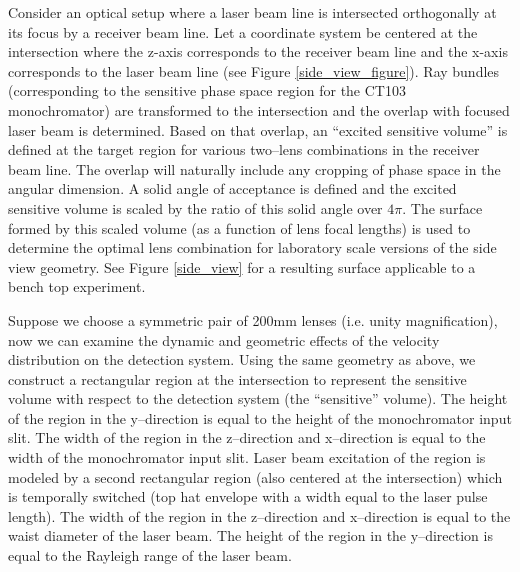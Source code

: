 \label{side}
Consider an optical setup where a laser beam line is intersected orthogonally at its focus by a receiver beam line. Let a coordinate system be centered at the intersection where the z-axis corresponds to the receiver beam line and the x-axis corresponds to the laser beam line (see Figure \ref{side_view_figure}). Ray bundles (corresponding to the sensitive phase space region for the CT103 monochromator) are transformed to the intersection and the overlap with focused laser beam is determined. Based on that overlap, an ``excited sensitive volume'' is defined at the target region for various two--lens combinations in the receiver beam line. The overlap will naturally include any cropping of phase space in the angular dimension. A solid angle of acceptance is defined and the excited sensitive volume is scaled by the ratio of this solid angle over $4\pi$. The surface formed by this scaled volume (as a function of lens focal lengths) is used to determine the optimal lens combination for laboratory scale versions of the side view geometry. See Figure \ref{side_view} for a resulting surface applicable to a bench top experiment.



Suppose we choose a symmetric pair of 200mm lenses (i.e. unity magnification), now we can examine the dynamic and geometric effects of the velocity distribution on the detection system. Using the same geometry as above, we construct a rectangular region at the intersection to represent the sensitive volume with respect to the detection system (the ``sensitive'' volume). The height of the region in the y--direction is equal to the height of the monochromator input slit. The width of the region in the z--direction and x--direction is equal to the width of the monochromator input slit. Laser beam excitation of the region is modeled by a second rectangular region (also centered at the intersection) which is temporally switched (top hat envelope with a width equal to the laser pulse length). The width of the region in the z--direction and x--direction is equal to the waist diameter of the laser beam. The height of the region in the y--direction is equal to the Rayleigh range of the laser beam.

